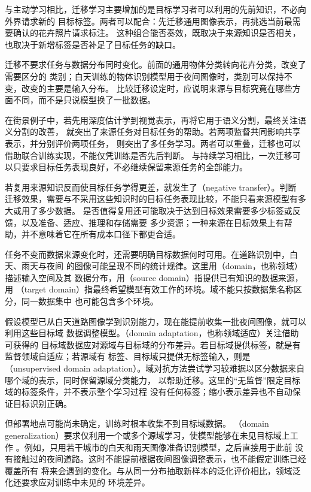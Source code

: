 与主动学习相比，迁移学习主要增加的是目标学习者可以利用的先前知识，不必向外界请求新的
目标标签。两者可以配合：先迁移通用图像表示，再挑选当前最需要确认的花卉照片请求标注。
这种组合能否奏效，既取决于来源知识是否相关，也取决于新增标签是否补足了目标任务的缺口。

迁移不要求任务与数据分布同时变化。前面的通用物体分类转向花卉分类，改变了需要区分的
类别；白天训练的物体识别模型用于夜间图像时，类别可以保持不变，改变的主要是输入分布。
比较迁移设定时，应说明来源与目标究竟在哪些方面不同，而不是只说模型换了一批数据。

在街景例子中，若先用深度估计学到视觉表示，再将它用于语义分割，最终关注语义分割的改善，
就突出了来源任务对目标任务的帮助。若两项监督共同影响共享表示，并分别评价两项任务，
则突出了多任务学习。两者可以重叠，迁移也可以借助联合训练实现，不能仅凭训练是否先后判断。
与持续学习相比，一次迁移可以只要求目标任务表现良好，不必继续保留来源任务的全部能力。

若复用来源知识反而使目标任务学得更差，就发生了（negative transfer）。判断
迁移效果，需要与不采用这些知识时的目标任务表现比较，不能只看来源模型有多大或用了多少数据。
是否值得复用还可能取决于达到目标效果需要多少标签或反馈，以及准备、适应、推理和存储需要
多少资源；一种来源在目标效果上有帮助，并不意味着它在所有成本口径下都更合适。

任务不变而数据来源变化时，还需要明确目标数据何时可用。在道路识别中，白天、雨天与夜间
的图像可能呈现不同的统计规律。这里用（domain，也称领域）描述输入空间及其
数据分布，用（source domain）指提供已有知识的数据来源，用
（target domain）指最终希望模型有效工作的环境。域不能只按数据集名称区分，同一数据集中
也可能包含多个环境。

假设模型已从白天道路图像学到识别能力，现在能提前收集一批夜间图像，就可以利用这些目标域
数据调整模型。（domain adaptation，也称领域适应）关注借助可获得的
目标域数据应对源域与目标域的分布差异。若目标域提供标签，就是有监督领域自适应；若源域有
标签、目标域只提供无标签输入，则是（unsupervised domain
adaptation）。域对抗方法尝试学习较难据以区分数据来自哪个域的表示，同时保留源域分类能力，
以帮助迁移。这里的“无监督”限定目标域的标签条件，并不表示整个学习过程
没有任何标签；缩小表示差异也不自动保证目标识别正确。

但部署地点可能尚未确定，训练时根本收集不到目标域数据。
（domain generalization）要求仅利用一个或多个源域学习，使模型能够在未见目标域上工作
。例如，只用若干城市的白天和雨天图像准备识别模型，之后直接用于此前
没有接触过的夜间道路。这时不能提前根据夜间图像调整表示，也不能假定训练已经覆盖所有
将来会遇到的变化。与从同一分布抽取新样本的泛化评价相比，领域泛化还要求应对训练中未见的
环境差异。

